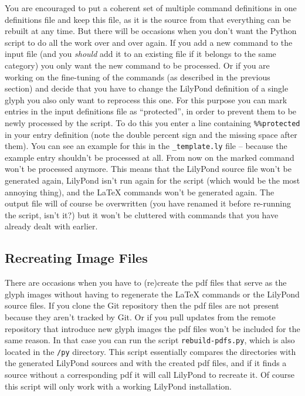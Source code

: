 \documentclass{OLLbook}
\begin{document}
You are encouraged to put a coherent set of multiple command definitions in one definitions file and keep this file, as it is the source from that everything can be rebuilt at any time.
But there will be occasions when you don't want the Python script to do all the work over and over again.
If you add a new command to the input file (and you \emph{should} add it to an existing file if it belongs to the same category) you only want the new command to be processed.
Or if you are working on the fine-tuning of the commands (as described in the previous section) and decide that you have to change the LilyPond definition of a single glyph you also only want to reprocess this one.
For this purpose you can mark entries in the input definitions file as “protected”, in order to prevent them to be newly processed by the script.
To do this you enter a line containing \verb|%%protected| in your entry definition (note the double percent sign and the missing space after them).
You can see an example for this in the \texttt{\_template.ly} file -- because the example entry shouldn't be processed at all.
From now on the marked command won't be processed anymore.
This means that the LilyPond source file won't be generated again, LilyPond isn't run again for the script (which would be the most annoying thing), and the \LaTeX{} commands won't be generated again.
The output file will of course be overwritten (you have renamed it before re-running the script, isn't it?) but it won't be cluttered with commands that you have already dealt with earlier.


\subsection{Recreating Image Files}
\label{subsec:BGI_recreating_images}

There are occasions when you have to (re)create the pdf files that serve as the glyph images without having to regenerate the \LaTeX{} commands or the LilyPond source files.
If you clone the Git repository then the pdf files are not present because they aren't tracked by Git.
Or if you pull updates from the remote repository that introduce new glyph images the pdf files won't be included for the same reason.
In that case you can run the script \texttt{rebuild-pdfs.py}, which is also located in the \texttt{/py} directory.
This script essentially compares the directories with the generated LilyPond sources and with the created pdf files, and if it finds a source without a corresponding pdf it will call LilyPond to recreate it.
Of course this script will only work with a working LilyPond installation.
\end{document}
